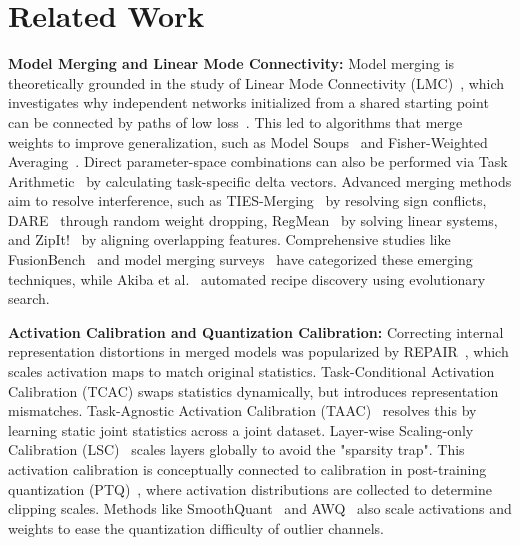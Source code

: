 \documentclass{article}
\theoremstyle{plain}
\theoremstyle{definition}
\theoremstyle{remark}
\begin{document}
\section{Related Work}
\label{sec:related}

\textbf{Model Merging and Linear Mode Connectivity:} Model merging is theoretically grounded in the study of Linear Mode Connectivity (LMC)~\cite{frankle2020linear,garipov2018loss,entezari2022role,draxler2018essentially}, which investigates why independent networks initialized from a shared starting point can be connected by paths of low loss~\cite{neyshabur2020what,ainsworth2023git}. This led to algorithms that merge weights to improve generalization, such as Model Soups~\cite{wortsman2022model} and Fisher-Weighted Averaging~\cite{matena2022merging}. Direct parameter-space combinations can also be performed via Task Arithmetic~\cite{ilharco2023editing} by calculating task-specific delta vectors. Advanced merging methods aim to resolve interference, such as TIES-Merging~\cite{yadav2023ties} by resolving sign conflicts, DARE~\cite{yu2023dare} through random weight dropping, RegMean~\cite{jin2023dataless} by solving linear systems, and ZipIt!~\cite{stoica2024zipit} by aligning overlapping features. Comprehensive studies like FusionBench~\cite{tang2024fusionbench} and model merging surveys~\cite{yang2024model} have categorized these emerging techniques, while Akiba et al.~\cite{akiba2025evolutionary} automated recipe discovery using evolutionary search.

\textbf{Activation Calibration and Quantization Calibration:} Correcting internal representation distortions in merged models was popularized by REPAIR~\cite{jordan2022repair}, which scales activation maps to match original statistics. Task-Conditional Activation Calibration (TCAC) swaps statistics dynamically, but introduces representation mismatches. Task-Agnostic Activation Calibration (TAAC)~\cite{submission3} resolves this by learning static joint statistics across a joint dataset. Layer-wise Scaling-only Calibration (LSC)~\cite{submission9} scales layers globally to avoid the "sparsity trap". This activation calibration is conceptually connected to calibration in post-training quantization (PTQ)~\cite{frantar2023gptq,shang2024enhancing}, where activation distributions are collected to determine clipping scales. Methods like SmoothQuant~\cite{xiao2023smoothquant} and AWQ~\cite{lin2024awq} also scale activations and weights to ease the quantization difficulty of outlier channels.
\end{document}
